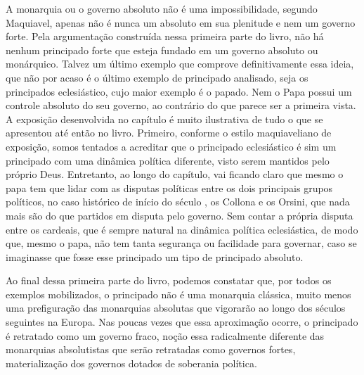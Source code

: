 A monarquia ou o governo absoluto não é uma impossibilidade, segundo
Maquiavel, apenas não é nunca um absoluto em sua plenitude e nem um
governo forte. Pela argumentação construída nessa primeira parte do
livro, não há nenhum principado forte que esteja fundado em um governo
absoluto ou monárquico. Talvez um último exemplo que comprove
definitivamente essa ideia, que não por acaso é o último exemplo de
principado analisado, seja os principados eclesiástico, cujo maior
exemplo é o papado. Nem o Papa possui um controle absoluto do seu
governo, ao contrário do que parece ser a primeira vista. A exposição
desenvolvida no capítulo  é muito ilustrativa de tudo o que se
apresentou até então no livro. Primeiro, conforme o estilo maquiaveliano
de exposição, somos tentados a acreditar que o principado eclesiástico é
sim um principado com uma dinâmica política diferente, visto serem
mantidos pelo próprio Deus. Entretanto, ao longo do capítulo, vai
ficando claro que mesmo o papa tem que lidar com as disputas políticas
entre os dois principais grupos políticos, no caso histórico de início
do século , os Collona e os Orsini, que nada mais são do que partidos
em disputa pelo governo. Sem contar a própria disputa entre os cardeais,
que é sempre natural na dinâmica política eclesiástica, de modo que,
mesmo o papa, não tem tanta segurança ou facilidade para governar, caso
se imaginasse que fosse esse principado um tipo de principado absoluto.

Ao final dessa primeira parte do livro, podemos constatar que, por todos
os exemplos mobilizados, o principado não é uma monarquia clássica,
muito menos uma prefiguração das monarquias absolutas que vigorarão ao
longo dos séculos seguintes na Europa. Nas poucas vezes que essa
aproximação ocorre, o principado é retratado como um governo fraco,
noção essa radicalmente diferente das monarquias absolutistas que serão
retratadas como governos fortes, materialização dos governos dotados de
soberania política.

